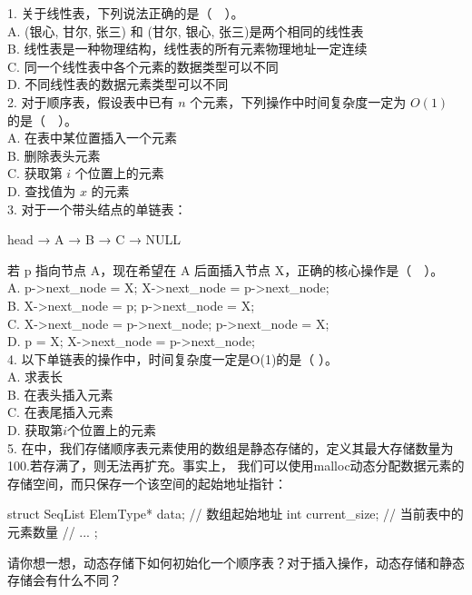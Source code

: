 %
%
1. 关于线性表，下列说法正确的是（　）。\\
A. (银心, 甘尔, 张三) 和 (甘尔, 银心, 张三)是两个相同的线性表 \\
B. 线性表是一种物理结构，线性表的所有元素物理地址一定连续\\
C. 同一个线性表中各个元素的数据类型可以不同\\
D. 不同线性表的数据元素类型可以不同\\

2. 对于顺序表，假设表中已有 \(n\) 个元素，下列操作中时间复杂度一定为 \(O(1)\) 的是（　）。\\
A. 在表中某位置插入一个元素\\
B. 删除表头元素\\
C. 获取第 \(i\) 个位置上的元素\\
D. 查找值为 \(x\) 的元素\\

3. 对于一个带头结点的单链表：
\begin{bulk}
head → A → B → C → NULL
\end{bulk}
若 p 指向节点 A，现在希望在 A 后面插入节点 X，正确的核心操作是（　）。\\
A. p->next\_node = X;
X->next\_node = p->next\_node;\\
B. X->next\_node = p;
p->next\_node = X;\\
C. X->next\_node = p->next\_node;
p->next\_node = X;\\
D. p = X;
X->next\_node = p->next\_node;\\

4. 以下单链表的操作中，时间复杂度一定是O(1)的是（  ）。\\
A. 求表长\\
B. 在表头插入元素\\
C. 在表尾插入元素\\
D. 获取第\(i\)个位置上的元素\\

5. 在中，我们存储顺序表元素使用的数组是静态存储的，定义其最大存储数量为100.若存满了，则无法再扩充。事实上，
我们可以使用malloc动态分配数据元素的存储空间，而只保存一个该空间的起始地址指针：
\begin{cppcode}
    struct SeqList{
        ElemType* data;         // 数组起始地址
        int current_size;       // 当前表中的元素数量
        // ...
    };
\end{cppcode}
请你想一想，动态存储下如何初始化一个顺序表？对于插入操作，动态存储和静态存储会有什么不同？\\

